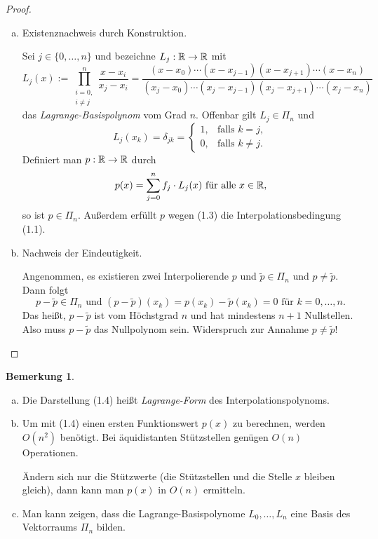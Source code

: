 \documentclass[
 a4paper,
 12pt,
 parskip=half
 ]{scrartcl}
\numberwithin{equation}{section}
\theoremstyle{plain}
\theoremstyle{definition}
\newtheorem{rmrk}{Bemerkung}[section] %
\numberwithin{equation}{section}
\begin{document}
\begin{proof}
 \begin{enumerate}[a)]
  \item Existenznachweis durch Konstruktion.
  
  Sei $j \in \{ 0, \ldots, n \}$ und bezeichne $L_j: \mathbb{R} \to \mathbb{R}$ mit
  \[ L_j(x) := \prod_{\substack{i=0,\\i \ne j}}^n \frac{x-x_i}{x_j-x_i} = \frac{(x-x_0)\cdots(x-x_{j-1})(x-x_{j+1})\cdots(x-x_n)}{(x_j-x_0)\cdots(x_j-x_{j-1})(x_j-x_{j+1})\cdots(x_j-x_n)} \]
  das \emph{Lagrange-Basispolynom} vom Grad $n$. Offenbar gilt $L_j \in \Pi_n$ und
  \begin{equation} L_j(x_k) = \delta_{jk} = \begin{cases}
                 1, &\text{falls } k = j, \\
                 0, &\text{falls } k \ne j.
                \end{cases} \end{equation}
  Definiert man $p: \mathbb{R} \to \mathbb{R}$ durch
  \begin{equation} p(x) = \sum_{j=0}^n f_j \cdot L_j(x) \text{ für alle } x \in \mathbb{R}, \end{equation}
  so ist $p \in \Pi_n$. Außerdem erfüllt $p$ wegen (1.3) die Interpolationsbedingung (1.1).
  \item Nachweis der Eindeutigkeit.
  
  Angenommen, es existieren zwei Interpolierende $p$ und $\tilde{p} \in \Pi_n$ und $p \ne \tilde{p}$. Dann folgt 
  \[ p - \tilde{p} \in \Pi_n \text{ und } (p-\tilde{p})(x_k) = p(x_k) - \tilde{p}(x_k) = 0 \text{ für } k = 0, \ldots, n. \]
  Das heißt, $p - \tilde{p}$ ist vom Höchstgrad $n$ und hat mindestens $n+1$ Nullstellen. Also muss $p-\tilde{p}$ das Nullpolynom sein. Widerspruch zur Annahme $p \ne \tilde{p}$!
 \end{enumerate}
\end{proof}

\begin{rmrk}
 \begin{enumerate}[a)]
  \item Die Darstellung (1.4) heißt \emph{Lagrange-Form} des Interpolationspolynoms.
  \item Um mit (1.4) einen ersten Funktionswert $p(x)$ zu berechnen, werden $O(n^2)$ benötigt. Bei äquidistanten Stützstellen genügen $O(n)$ Operationen.
  
  Ändern sich nur die Stützwerte (die Stützstellen und die Stelle $x$ bleiben gleich), dann kann man $p(x)$ in $O(n)$ ermitteln.
  \item Man kann zeigen, dass die Lagrange-Basispolynome $L_0, \ldots, L_n$ eine Basis des Vektorraums $\Pi_n$ bilden.
 \end{enumerate}
\end{rmrk}
\end{document}
